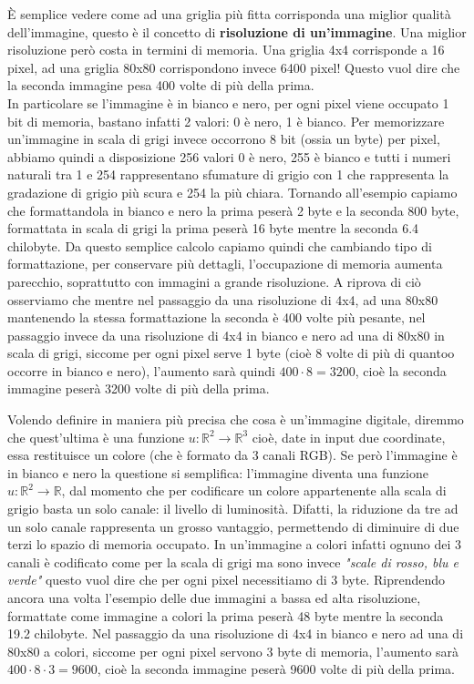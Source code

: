 \noindent
\`E semplice vedere come ad una griglia più fitta corrisponda una miglior qualità dell'immagine, questo è il concetto di \textbf{risoluzione di un'immagine}. 
Una miglior risoluzione però costa in termini di memoria. Una griglia 4x4 corrisponde a 16 pixel, ad una griglia 80x80 corrispondono invece 6400 pixel! Questo vuol dire che la seconda immagine pesa 400 volte di più della prima.\\
In particolare se l'immagine è in bianco e nero, per ogni pixel viene occupato 1 bit di memoria, bastano infatti 2 valori: 0 è nero, 1 è bianco. Per memorizzare un'immagine in scala di grigi invece occorrono 8 bit (ossia un byte) per pixel, abbiamo quindi a disposizione 256 valori 0 è nero, 255 è bianco e tutti i numeri naturali tra 1 e 254 rappresentano sfumature di grigio con 1 che rappresenta la gradazione di grigio più scura e 254 la più chiara.  Tornando all'esempio capiamo che formattandola in bianco e nero la prima peserà 2 byte e la seconda 800 byte, formattata in scala di grigi la prima peserà 16 byte mentre la seconda 6.4 chilobyte.  Da questo semplice calcolo capiamo quindi che cambiando tipo di formattazione, per conservare più dettagli, l'occupazione di memoria aumenta parecchio, soprattutto con immagini a grande risoluzione. A riprova di ciò osserviamo che mentre nel passaggio da una risoluzione di 4x4, ad una 80x80 mantenendo la stessa formattazione la seconda è 400 volte più pesante, nel passaggio invece da una risoluzione di 4x4 in bianco e nero ad una di 80x80 in scala di grigi, siccome per ogni pixel serve 1 byte (cioè 8 volte di più di quantoo occorre in bianco e nero), l'aumento sarà quindi $400\cdot8=3200$, cioè la seconda immagine peserà 3200 volte di più della prima.

\vspace{1em} \noindent
Volendo definire in maniera più precisa che cosa è un'immagine digitale, diremmo che quest'ultima è una funzione $u:\mathbb R^2\rightarrow\mathbb R^3$ cioè, date in input due coordinate, essa restituisce un colore (che è formato da 3 canali RGB). Se però l'immagine è in bianco e nero la questione si semplifica: l'immagine diventa una funzione $u:\mathbb R^2\rightarrow\mathbb R$, dal momento che per codificare un colore appartenente alla scala di grigio basta un solo canale: il livello di luminosità. Difatti, la riduzione da tre ad un solo canale rappresenta un grosso vantaggio, permettendo di diminuire di due terzi lo spazio di memoria occupato.
In un'immagine a colori infatti ognuno dei 3 canali è codificato come per la scala di grigi ma sono invece \textit{"scale di rosso, blu e verde"} questo vuol dire che per ogni pixel necessitiamo di 3 byte. Riprendendo ancora una volta l'esempio delle due immagini a bassa ed alta risoluzione, formattate come immagine a colori la prima peserà 48 byte mentre la seconda 19.2 chilobyte. Nel passaggio da una risoluzione di 4x4 in bianco e nero ad una di 80x80 a colori, siccome per ogni pixel servono 3 byte di memoria, l'aumento sarà $400\cdot8\cdot3=9600$, cioè la seconda immagine peserà 9600 volte di più della prima.\\

